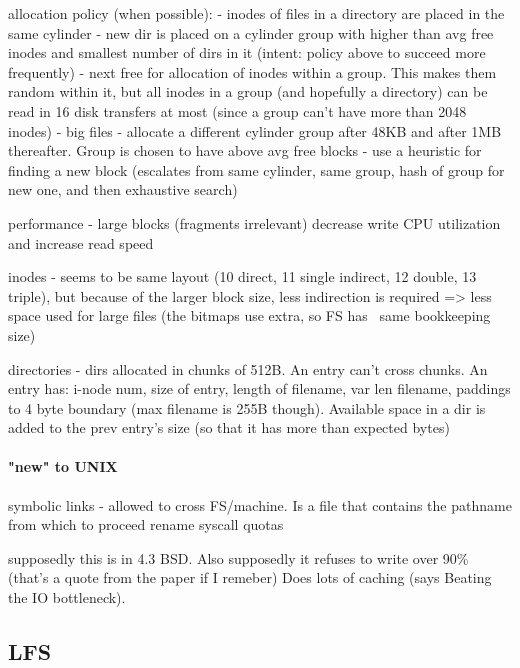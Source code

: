 \documentclass[a4paper]{article}
\begin{document}
        allocation policy (when possible):
            - inodes of files in a directory are placed in the same cylinder
            - new dir is placed on a cylinder group with higher than avg free
              inodes and smallest number of dirs in it (intent: policy above to
              succeed more frequently)
            - next free for allocation of inodes within a group. This makes
              them random within it, but all inodes in a group (and hopefully a
              directory) can be read in 16 disk transfers at most (since a group
              can't have more than 2048 inodes)
            - big files - allocate a different cylinder group after 48KB and
              after 1MB thereafter. Group is chosen to have above avg free blocks
            - use a heuristic for finding a new block (escalates from same
              cylinder, same group, hash of group for new one, and then
              exhaustive search)

        performance - large blocks (fragments irrelevant) decrease write CPU
        utilization and increase read speed

        inodes - seems to be same layout (10 direct, 11 single indirect, 12
        double, 13 triple), but because of the larger block size, less
        indirection is required => less space used for large files
        (the bitmaps use extra, so FS has ~same bookkeeping size)

        directories - dirs allocated in chunks of 512B. An entry can't cross
        chunks. An entry has: i-node num, size of entry, length of filename,
        var len filename, paddings to 4 byte boundary (max filename is 255B
        though). Available space in a dir is added to the prev entry's size (so
        that it has more than expected bytes)

        \paragraph{"new" to UNIX}
        symbolic links - allowed to cross FS/machine. Is a file that contains
        the pathname from which to proceed
        rename syscall
        quotas

        supposedly this is in 4.3 BSD. Also supposedly it refuses to write over
        90\% (that's a quote from the paper if I remeber)
        Does lots of caching (says Beating the IO bottleneck).

    \subsection{LFS}
\end{document}
